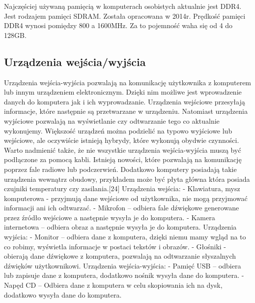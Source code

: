 \documentclass[12pt, a4paper, onside, polish]{article}				%
\begin{document}
Najczęściej używaną pamięcią w komputerach osobistych aktualnie jest DDR4. Jest rodzajem pamięci SDRAM. Została opracowana w 2014r. Prędkość pamięci DDR4 wynosi pomiędzy 800 a 1600MHz. Za to pojemność waha się od 4 do 128GB.  


\subsection{Urządzenia wejścia/wyjścia}
\hspace{\parindent}
Urządzenia wejścia-wyjścia pozwalają na komunikację użytkownika z komputerem lub innym urządzeniem elektronicznym. Dzięki nim możliwe jest wprowadzenie danych do komputera jak i ich wyprowadzanie. Urządzenia wejściowe przesyłają informacje, które następnie są przetwarzane w urządzeniu. Natomiast urządzenia wyjściowe pozwalają na wyświetlanie czy odtwarzanie tego co aktualnie wykonujemy. Większość urządzeń można podzielić na typowo wyjściowe lub wejściowe, ale oczywiście istnieją hybrydy, które wykonują obydwie czynności. Warto nadmienić także, że nie wszystkie urządzenia wejścia-wyjścia muszą być podłączone za pomocą kabli. Istnieją nowości, które pozwalają na komunikację poprzez fale radiowe lub podczerwień. Dodatkowo komputery posiadają takie urządzenia wewnątrz obudowy, przykładem może być płyta główna która posiada czujniki temperatury czy zasilania.[24]  \newline\newline
Urządzenia wejścia: \newline
- Klawiatura, mysz komputerowa - przyjmują dane wejściowe od użytkownika, nie mogą przyjmować informacji ani ich odtwarzać. \newline
- Mikrofon – odbiera fale dźwiękowe generowane przez źródło wejściowe a następnie wysyła je do komputera. \newline
- Kamera internetowa – odbiera obraz a następnie wysyła je do komputera. \newline\newline
 Urządzenia wyjścia: \newline
- Monitor – odbiera dane z komputera, dzięki niemu mamy wgląd na to co robimy, wyświetla informacje w postaci tekstów i obrazów. \newline
- Głośniki - obierają dane dźwiękowe z komputera, pozwalają na odtwarzanie słyszalnych dźwięków użytkownikowi. \newline\newline
Urządzenia wejścia-wyjścia: \newline
- Pamięć USB – odbiera lub zapisuje dane z komputera, dodatkowo nośnik wysyła dane do komputera. \newline
- Napęd CD – Odbiera dane z komputera w celu skopiowania ich na dysk, dodatkowo wysyła dane do komputera. \newline
\end{document}
